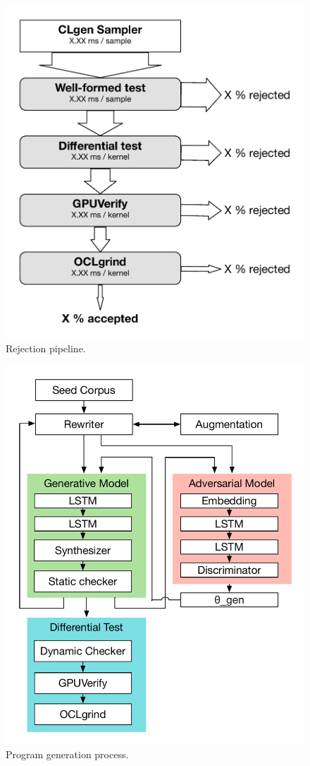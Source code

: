 \begin{figure}
        \centering
        \includegraphics[width=.8\columnwidth]{img/rej} %
        \caption{%
                Rejection pipeline.%
        }%
        \label{fig:deeptune}
\end{figure}

\begin{figure}
        \centering
        \includegraphics[width=.95\columnwidth]{img/proc} %
        \caption{%
                Program generation process.%
        }%
        \label{fig:deeptune}
\end{figure}










\printbibliography
        
